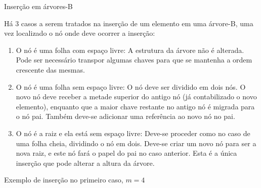 \begin{frame}[fragile]{Inserção em árvores-B}

	Há 3 casos a serem tratados na {inserção} de um elemento em uma árvore-B, uma vez {localizado} o nó onde deve 
	ocorrer a inserção:

	\begin{enumerate}
		\item {O nó é uma folha com espaço livre}: A estrutura da árvore {não é alterada}. Pode ser necessário 
		{transpor} algumas chaves para que se mantenha a ordem {crescente} das mesmas.

		\item {O nó é uma folha sem espaço livre}: O nó deve ser {dividido} em dois nós. O {novo} 
        nó deve receber a {metade superior} do antigo nó (já contabilizado o novo elemento), 
        enquanto que a {maior chave} restante no antigo nó 
		é migrada para o nó pai. Também deve-se adicionar uma {referência} ao novo nó no pai.

		\item {O nó é a raiz e ela está sem espaço livre}: Deve-se proceder como no caso de uma {folha cheia}, 
		dividindo o nó em dois. Deve-se criar um novo nó para ser a {nova raiz}, e este nó fará o papel do {pai} 
		no caso anterior. Esta é  a única inserção que pode alterar a {altura} da árvore.
	\end{enumerate} 

\end{frame}

\begin{frame}[fragile]{Exemplo de inserção no primeiro caso, $m = 4$}

\end{frame}

